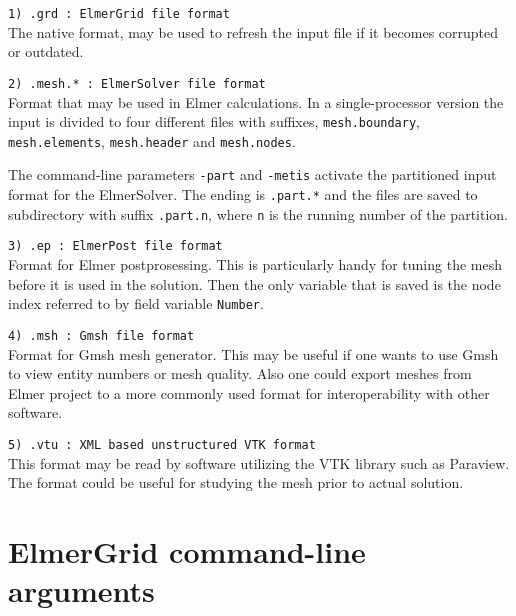 \begin{description}

\item \texttt{1)  .grd     : ElmerGrid file format} \\
The native format, may be used to refresh the input file if it becomes
corrupted or outdated.

\item \texttt{2)  .mesh.*   : ElmerSolver file format} \\
Format that may be used in Elmer calculations.
In a single-processor version 
the input is divided to four different files with 
suffixes, \texttt{mesh.boundary}, \texttt{mesh.elements},
\texttt{mesh.header} and \texttt{mesh.nodes}.

The command-line parameters \texttt{-part} and \texttt{-metis} 
activate the partitioned 
input format for the ElmerSolver. 
The ending is \texttt{.part.*} and the 
files are saved to 
subdirectory with suffix \texttt{.part.n}, where
\texttt{n} is the running number of the partition.

\item \texttt{3)  .ep       : ElmerPost file format} \\
Format for Elmer postprosessing. This is particularly handy for tuning the
mesh before it is used in the solution. Then the only variable that is saved is 
the node index referred to by field variable \texttt{Number}.

\item \texttt{4)  .msh      : Gmsh file format} \\
Format for Gmsh mesh generator. This may be useful if one wants to use Gmsh to view entity numbers or mesh quality. 
Also one could export meshes from Elmer project to a more commonly used format for interoperability with other software.

\item \texttt{5)  .vtu      : XML based unstructured VTK format} \\
This format may be read by software utilizing the VTK library such as Paraview. 
The format could be useful for studying the mesh prior to actual solution.



\end{description}



\section{ElmerGrid command-line arguments}

